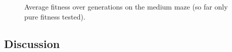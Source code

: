 \begin{figure}
    \begin{center}
        
    \end{center}
    \caption{Average fitness over generations on the medium maze (so far only pure fitness tested).}
\end{figure}

\newpage
\subsection{Discussion}
